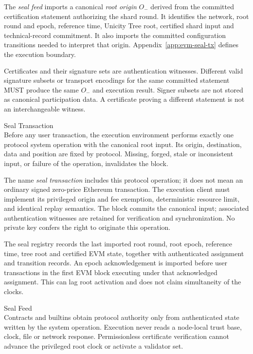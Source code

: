 The \emph{seal feed} imports a canonical \emph{root origin} $O_-$ derived from the committed certification statement authorizing the shard round. It identifies the network, root round and epoch, reference time, Unicity Tree root, certified shard input and technical-record commitment. It also imports the committed configuration transitions needed to interpret that origin. Appendix~\ref{app:evm-seal-tx} defines the execution boundary.

Certificates and their signature sets are authentication witnesses. Different valid signature subsets or transport encodings for the same committed statement MUST produce the same $O_-$ and execution result. Signer subsets are not stored as canonical participation data. A certificate proving a different statement is not an interchangeable witness.

\begin{ruledef*}{Seal Transaction} \\
 Before any user transaction, the execution environment performs exactly one protocol system operation with the canonical root input. Its origin, destination, data and position are fixed by protocol. Missing, forged, stale or inconsistent input, or failure of the operation, invalidates the block.
\end{ruledef*}

The name \emph{seal transaction} includes this protocol operation; it does not mean an ordinary signed zero-price Ethereum transaction. The execution client must implement its privileged origin and fee exemption, deterministic resource limit, and identical replay semantics. The block commits the canonical input; associated authentication witnesses are retained for verification and synchronization. No private key confers the right to originate this operation.

The seal registry records the last imported root round, root epoch, reference time, tree root and certified EVM state, together with authenticated assignment and transition records. An epoch acknowledgement is imported before user transactions in the first EVM block executing under that acknowledged assignment. This can lag root activation and does not claim simultaneity of the clocks.

\begin{ruledef*}{Seal Feed} \\
 Contracts and builtins obtain protocol authority only from authenticated state written by the system operation. Execution never reads a node-local trust base, clock, file or network response. Permissionless certificate verification cannot advance the privileged root clock or activate a validator set.
\end{ruledef*}

